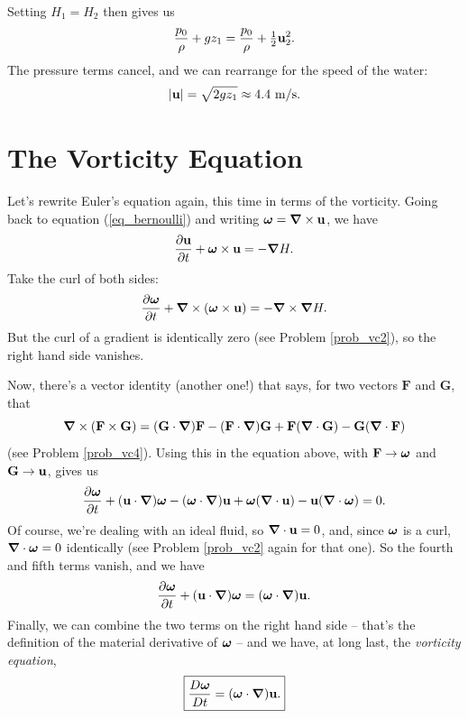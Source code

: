 \begin{example}
Setting $H_1 = H_2$ then gives us
\[
\frac{p_0}{\rho} + gz_1 = \frac{p_0}{\rho} + \tfrac{1}{2} \mathbf{u}_2^2.
\]
The pressure terms cancel, and we can rearrange for the speed of the water:
\[
|\mathbf{u}| = \sqrt{2gz_1} \approx 4.4 \text{ m/s}.
\]
\end{example}









\section{The Vorticity Equation}
\label{sec_vorticity_eq}

Let's rewrite Euler's equation again, this time in terms of the vorticity.  Going back to equation (\ref{eq_bernoulli}) and writing $\boldsymbol{\omega} = \boldsymbol{\nabla} \times \mathbf{u}$, we have
\[
\frac{\partial \mathbf{u}}{\partial t} + \boldsymbol{\omega} \times \mathbf{u} = -\boldsymbol{\nabla} H.
\]
Take the curl of both sides:
\[
\frac{\partial \boldsymbol{\omega}}{\partial t} + \boldsymbol{\nabla} \times (\boldsymbol{\omega} \times \mathbf{u}) = -\boldsymbol{\nabla} \times \boldsymbol{\nabla} H.
\]
But the curl of a gradient is identically zero (see Problem \ref{prob_vc2}), so the right hand side vanishes.

Now, there's a vector identity (another one!) that says, for two vectors $\mathbf{F}$ and $\mathbf{G}$, that
\begin{equation}
\boldsymbol{\nabla} \times (\mathbf{F} \times \mathbf{G}) = (\mathbf{G} \cdot \boldsymbol{\nabla}) \mathbf{F} - (\mathbf{F} \cdot \boldsymbol{\nabla}) \mathbf{G} + \mathbf{F} (\boldsymbol{\nabla} \cdot \mathbf{G}) - \mathbf{G} (\boldsymbol{\nabla} \cdot \mathbf{F})
\end{equation}
(see Problem \ref{prob_vc4}).  Using this in the equation above, with $\mathbf{F} \to \boldsymbol{\omega}$ and $\mathbf{G} \to \mathbf{u}$, gives us
\[
\frac{\partial \boldsymbol{\omega}}{\partial t} + (\mathbf{u} \cdot \boldsymbol{\nabla}) \boldsymbol{\omega} - (\boldsymbol{\omega} \cdot \boldsymbol{\nabla})\mathbf{u} + \boldsymbol{\omega} (\boldsymbol{\nabla} \cdot \mathbf{u}) - \mathbf{u}(\boldsymbol{\nabla} \cdot \boldsymbol{\omega}) = 0.
\]
Of course, we're dealing with an ideal fluid, so $\boldsymbol{\nabla} \cdot \mathbf{u} = 0$, and, since $\boldsymbol{\omega}$ is a curl, $\boldsymbol{\nabla} \cdot \boldsymbol{\omega} = 0$ identically (see Problem \ref{prob_vc2} again for that one).  So the fourth and fifth terms vanish, and we have
\[
\frac{\partial \boldsymbol{\omega}}{\partial t} + (\mathbf{u} \cdot \boldsymbol{\nabla}) \boldsymbol{\omega} = (\boldsymbol{\omega} \cdot \boldsymbol{\nabla})\mathbf{u}.
\]
Finally, we can combine the two terms on the right hand side -- that's the definition of the material derivative of $\boldsymbol{\omega}$ -- and we have, at long last, the \emph{vorticity equation},
\begin{equation}
\label{eq_vorticity}
\boxed{
\frac{D \boldsymbol{\omega}}{Dt} = (\boldsymbol{\omega} \cdot \boldsymbol{\nabla}) \mathbf{u}.
}
\end{equation}


